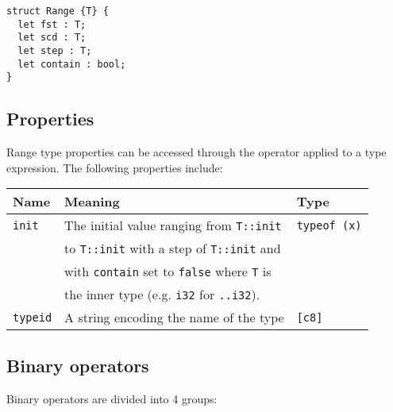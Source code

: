 \begin{lstlisting}[style=coloredverbatim]
struct Range {T} {
  let fst : T;
  let scd : T;
  let step : T;
  let contain : bool;
}
\end{lstlisting}

\subsection {Properties}

Range type properties can be accessed through the operator \token{::} applied
to a type expression. The following properties include:

\begin{center}\begin{adjustbox}{max width=\linewidth}
  \begin{tabular}{|l|ll|}
    \hline
    Name & Meaning & Type\\
    \hline
    \hline
    \texttt{init} & The initial value ranging from \texttt{T::init} & \texttt{typeof (x)}\\
    & to \texttt{T::init} with a step of \texttt{T::init} and & \\
    & with \texttt{contain} set to \texttt{false} where \texttt{T} is & \\
    & the inner type (e.g. \texttt{i32} for \texttt{..i32}). &\\
    \hline
    \texttt{typeid} & A string encoding the name of the type & \texttt{[c8]} \\
    \hline
  \end{tabular}
\end{adjustbox}\end{center}


\subsection {Binary operators}

Binary operators are divided into 4 groups:

